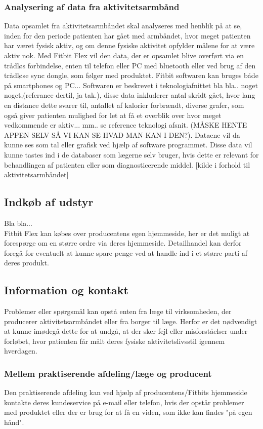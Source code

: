 \subsubsection{Analysering af data fra aktivitetsarmbånd}  
Data opsamlet fra aktivitetsarmbåndet skal analyseres med henblik på at se, inden for den periode patienten har gået med armbåndet, hvor meget patienten har været fysisk aktiv, og om denne fysiske aktivitet opfylder målene for at være aktiv nok.  
Med Fitbit Flex vil den data, der er opsamlet blive overført via en trådløs forbindelse, enten til telefon eller PC med bluetooth eller ved brug af den trådløse sync dongle, som følger med produktet. Fitbit softwaren kan bruges både på smartphones og PC... Softwaren er beskrevet i teknologiafnittet bla bla.. noget noget,(referance dertil, ja tak.), disse data inkluderer antal skridt gået, hvor lang en distance dette svarer til, antallet af kalorier forbrændt, diverse grafer, som også giver patienten mulighed for let at få et overblik over hvor meget vedkommende er aktiv... mm.. se reference teknologi afsnit. (MÅSKE HENTE APPEN SELV SÅ VI KAN SE HVAD MAN KAN I DEN?). Dataene vil da kunne ses som tal eller grafisk ved hjælp af software programmet. Disse data vil kunne tastes ind i de databaser som lægerne selv bruger, hvis dette er relevant for behandlingen af patienten eller som diagnosticerende middel. [kilde i forhold til aktivitetsarmbåndet]

\subsection{Indkøb af udstyr}	
Bla bla...\\
Fitbit Flex kan købes over producentens egen hjemmeside, her er det muligt at forespørge om en større ordre via deres hjemmeside. Detailhandel kan derfor foregå for eventuelt at kunne spare penge ved at handle ind i et større parti af deres produkt.

\subsection{Information og kontakt}
Problemer eller spørgsmål kan opstå enten fra læge til virksomheden, der producerer aktivitetsarmbåndet eller fra borger til læge. Herfor er det nødvendigt at kunne imødegå dette for at undgå, at der sker fejl eller misforståelser under forløbet, hvor patienten får målt deres fysiske aktivitetslivsstil igennem hverdagen. 

\subsubsection{Mellem praktiserende afdeling/læge og producent}
Den praktiserende afdeling kan ved hjælp af producentens/Fitbits hjemmeside kontakte deres kundeservice på e-mail eller telefon, hvis der opstår problemer med produktet eller der er brug for at få en viden, som ikke kan findes "på egen hånd". 

